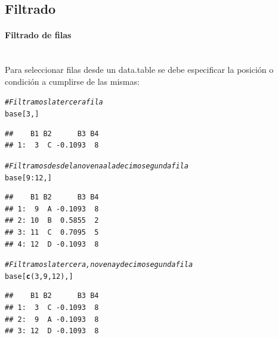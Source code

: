 \documentclass[11pt,a4paper,oneside]{book}\usepackage[]{graphicx}\usepackage[]{color}
\makeatletter
\newcommand{\hlnum}[1]{\textcolor[rgb]{0.686,0.059,0.569}{#1}}%
\newcommand{\hlcom}[1]{\textcolor[rgb]{0.678,0.584,0.686}{\textit{#1}}}%
\newcommand{\hlopt}[1]{\textcolor[rgb]{0,0,0}{#1}}%
\newcommand{\hlstd}[1]{\textcolor[rgb]{0.345,0.345,0.345}{#1}}%
\newcommand{\hlkwd}[1]{\textcolor[rgb]{0.737,0.353,0.396}{\textbf{#1}}}%
\newenvironment{kframe}{%
 \def\at@end@of@kframe{}%
 \ifinner\ifhmode%
  \def\at@end@of@kframe{\end{minipage}}%
  \begin{minipage}{\columnwidth}%
 \fi\fi%
 \def\FrameCommand##1{\hskip\@totalleftmargin \hskip-\fboxsep
 \colorbox{shadecolor}{##1}\hskip-\fboxsep
     \hskip-\linewidth \hskip-\@totalleftmargin \hskip\columnwidth}%
 \MakeFramed {\advance\hsize-\width
   \@totalleftmargin\z@ \linewidth\hsize
   \@setminipage}}%
 {\par\unskip\endMakeFramed%
 \at@end@of@kframe}
\newenvironment{knitrout}{}{} %
\makeatother
\begin{document}
\begin{itemize}
\subsection{Filtrado}

\paragraph{Filtrado de filas}
~\\

Para seleccionar filas desde un data.table se debe especificar la posición o condición a cumplirse de las mismas:
\begin{knitrout}
\color{fgcolor}\begin{kframe}
\begin{alltt}
\hlcom{# Filtramos la tercera fila}
\hlstd{base[}\hlnum{3}\hlstd{, ]}
\end{alltt}
\begin{verbatim}
##    B1 B2      B3 B4
## 1:  3  C -0.1093  8
\end{verbatim}
\begin{alltt}
\hlcom{# Filtramos desde la novena a la decimo segunda fila}
\hlstd{base[}\hlnum{9}\hlopt{:}\hlnum{12}\hlstd{, ]}
\end{alltt}
\begin{verbatim}
##    B1 B2      B3 B4
## 1:  9  A -0.1093  8
## 2: 10  B  0.5855  2
## 3: 11  C  0.7095  5
## 4: 12  D -0.1093  8
\end{verbatim}
\begin{alltt}
\hlcom{# Filtramos la tercera, novena y decimo segunda fila}
\hlstd{base[}\hlkwd{c}\hlstd{(}\hlnum{3}\hlstd{,} \hlnum{9}\hlstd{,} \hlnum{12}\hlstd{), ]}
\end{alltt}
\begin{verbatim}
##    B1 B2      B3 B4
## 1:  3  C -0.1093  8
## 2:  9  A -0.1093  8
## 3: 12  D -0.1093  8
\end{verbatim}
\end{kframe}
\end{knitrout}


\end{itemize}
\end{document}
